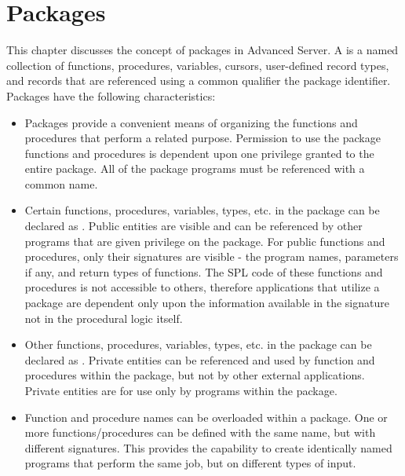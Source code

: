 \documentclass[letterpaper,10pt,english,openany,oneside]{sphinxmanual}
\begin{document}
\chapter{Packages}
\label{\detokenize{packages::doc}}\label{\detokenize{packages:packages}}
This chapter discusses the concept of packages in Advanced Server. A
 is a named collection of functions, procedures, variables,
cursors, user-defined record types, and records that are referenced
using a common qualifier \textendash{} the package identifier. Packages have the
following characteristics:
\begin{itemize}
\item {} 
Packages provide a convenient means of organizing the functions and
procedures that perform a related purpose. Permission to use the
package functions and procedures is dependent upon one privilege
granted to the entire package. All of the package programs must be
referenced with a common name.

\item {} 
Certain functions, procedures, variables, types, etc. in the package
can be declared as . Public entities are visible and can be
referenced by other programs that are given  privilege on the
package. For public functions and procedures, only their signatures
are visible - the program names, parameters if any, and return types
of functions. The SPL code of these functions and procedures is not
accessible to others, therefore applications that utilize a package
are dependent only upon the information available in the signature \textendash{}
not in the procedural logic itself.

\item {} 
Other functions, procedures, variables, types, etc. in the package
can be declared as . Private entities can be referenced and
used by function and procedures within the package, but not by other
external applications. Private entities are for use only by programs
within the package.

\item {} 
Function and procedure names can be overloaded within a package. One
or more functions/procedures can be defined with the same name, but
with different signatures. This provides the capability to create
identically named programs that perform the same job, but on
different types of input.

\end{itemize}
\end{document}
